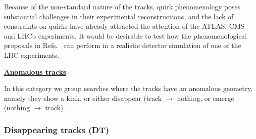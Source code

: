 Because of the non-standard nature of the tracks, quirk phenomenology poses substantial challenges in their experimental reconstructions, and the lack of constraints on quirks have already attracted the attention of the ATLAS, CMS and LHCb experiments. It would be desirable to test how the phenomenological proposals in Refs.~\cite{Farina:2017cts,Knapen:2017kly} can perform in a realistic detector simulation of one of the LHC experiments.

\vspace{1cm}

{\bf \underline{Anomalous tracks}}
\vspace{1cm}

In this category we group searches where the tracks have an anomalous geometry, namely they show a kink, or either disappear (track $\to$ nothing, or emerge (nothing $\to$ track).

\subsubsection{Disappearing tracks (DT)} 

